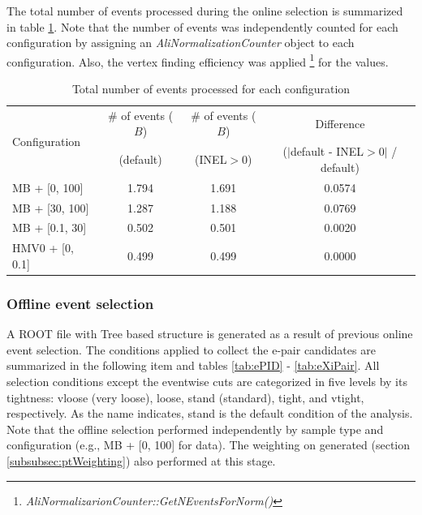 The total number of events processed during the online selection is summarized in table \ref{tab:nEvents}.
Note that the number of events was independently counted for each configuration by assigning an \textit{AliNormalizationCounter} object to each configuration. Also, the vertex finding efficiency was applied \footnote{\textit{AliNormalizarionCounter::GetNEventsForNorm()}} for the values.

\vspace{\columnsep}
\begin{table}[h]
    \centering
    \small
    \begin{tabular}{l|c|c|c}
    \hline\hline
    \multirow{2}{*}{Configuration} & \# of events ($B$) & \# of events ($B$) & Difference \\
    & (default) & (INEL$>$0) & ($|$default - INEL$>$0$|$ / default) \\\hline
    MB + [0, 100]   & 1.794 & 1.691 & 0.0574 \\\hline
    MB + [30, 100]  & 1.287 & 1.188 & 0.0769 \\\hline
    MB + [0.1, 30]  & 0.502 & 0.501 & 0.0020 \\\hline
    HMV0 + [0, 0.1] & 0.499 & 0.499 & 0.0000 \\
    \hline\hline
    \end{tabular}
    \caption{Total number of events processed for each configuration}
    \label{tab:nEvents}
\end{table}





\vspace{\columnsep}
\subsubsection{Offline event selection} \label{subsubsec:offSel}
A ROOT file with Tree based structure is generated as a result of previous online event selection. The conditions applied to collect the e-\Xim pair candidates are summarized in the following item and tables \ref{tab:ePID} - \ref{tab:eXiPair}.
All selection conditions except the eventwise cuts are categorized in five levels by its tightness: vloose (very loose), loose, stand (standard), tight, and vtight, respectively. As the name indicates, stand is the default condition of the analysis.
Note that the offline selection performed independently by sample type and configuration (e.g., MB + [0, 100] for data). The weighting on generated \pt (section \ref{subsubsec:ptWeighting}) also performed at this stage.

